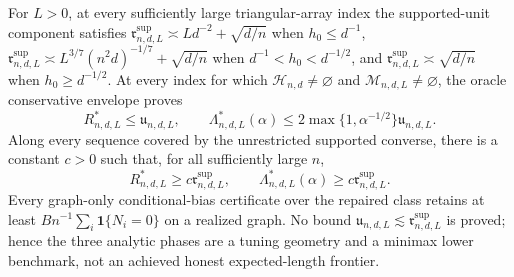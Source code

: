 For \(L>0\), at every sufficiently large triangular-array index the supported-unit component satisfies \(\mathfrak r^{\mathrm{sup}}_{n,d,L}\asymp Ld^{-2}+\sqrt{d/n}\) when \(h_0\leq d^{-1}\), \(\mathfrak r^{\mathrm{sup}}_{n,d,L}\asymp L^{3/7}(n^2d)^{-1/7}+\sqrt{d/n}\) when \(d^{-1}<h_0<d^{-1/2}\), and \(\mathfrak r^{\mathrm{sup}}_{n,d,L}\asymp\sqrt{d/n}\) when \(h_0\geq d^{-1/2}\).  At every index for which \(\mathcal H_{n,d}\ne\varnothing\) and \(\mathcal M_{n,d,L}\ne\varnothing\), the oracle conservative envelope proves
\[
 R^*_{n,d,L}\leq\mathfrak u_{n,d,L},
 \qquad
 \Lambda^*_{n,d,L}(\alpha)
 \leq2\max\{1,\alpha^{-1/2}\}\mathfrak u_{n,d,L}.
\]
Along every sequence covered by the unrestricted supported converse, there is a constant \(c>0\) such that, for all sufficiently large \(n\),
\[
 R^*_{n,d,L}\geq c\mathfrak r^{\mathrm{sup}}_{n,d,L},
 \qquad
 \Lambda^*_{n,d,L}(\alpha)\geq c\mathfrak r^{\mathrm{sup}}_{n,d,L}.
\]
Every graph-only conditional-bias certificate over the repaired class retains at least \(Bn^{-1}\sum_i\mathbf1\{N_i=0\}\) on a realized graph.  No bound \(\mathfrak u_{n,d,L}\lesssim\mathfrak r^{\mathrm{sup}}_{n,d,L}\) is proved; hence the three analytic phases are a tuning geometry and a minimax lower benchmark, not an achieved honest expected-length frontier.